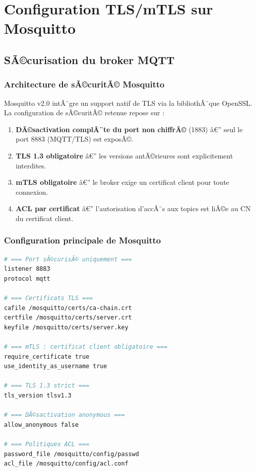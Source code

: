\chapter{Configuration TLS/mTLS sur Mosquitto}

\section{SÃ©curisation du broker MQTT}

\subsection{Architecture de sÃ©curitÃ© Mosquitto}

Mosquitto v2.0 intÃ¨gre un support natif de TLS via la bibliothÃ¨que OpenSSL. La configuration de sÃ©curitÃ© retenue repose sur :
\begin{enumerate}
  \item \textbf{DÃ©sactivation complÃ¨te du port non chiffrÃ©} (1883) â€” seul le port 8883 (MQTT/TLS) est exposÃ©.
  \item \textbf{TLS 1.3 obligatoire} â€” les versions antÃ©rieures sont explicitement interdites.
  \item \textbf{mTLS obligatoire} â€” le broker exige un certificat client pour toute connexion.
  \item \textbf{ACL par certificat} â€” l'autorisation d'accÃ¨s aux topics est liÃ©e au CN du certificat client.
\end{enumerate}

\subsection{Configuration principale de Mosquitto}

\begin{lstlisting}[language=bash, caption=Configuration Mosquitto (\texttt{mosquitto.conf}) avec TLS 1.3 et mTLS]
# === Port sÃ©curisÃ© uniquement ===
listener 8883
protocol mqtt

# === Certificats TLS ===
cafile /mosquitto/certs/ca-chain.crt
certfile /mosquitto/certs/server.crt
keyfile /mosquitto/certs/server.key

# === mTLS : certificat client obligatoire ===
require_certificate true
use_identity_as_username true

# === TLS 1.3 strict ===
tls_version tlsv1.3

# === DÃ©sactivation anonymous ===
allow_anonymous false

# === Politiques ACL ===
password_file /mosquitto/config/passwd
acl_file /mosquitto/config/acl.conf
\end{lstlisting}

